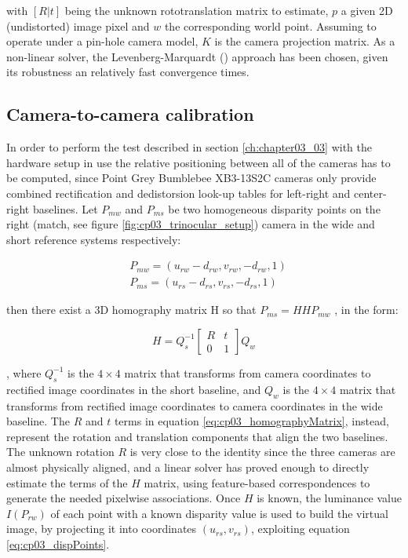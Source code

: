 with $[R|t]$ being the unknown rototranslation matrix to estimate, $p$ a given 2D (undistorted) image pixel and $w$ the corresponding world point. Assuming to operate under a pin-hole camera model, $K$ is the camera projection matrix. As a non-linear solver, the Levenberg-Marquardt (\cite{Levenberg1944}) approach has been chosen, given its robustness an relatively fast convergence times.

\subsection{Camera-to-camera calibration}\label{ch:chapter03_02_02}

In order to perform the test described in section \ref{ch:chapter03_03} with the hardware setup in use the relative positioning between all of the cameras has to be computed, since Point Grey Bumblebee\textregistered{} XB3-13S2C cameras only provide combined rectification and dedistorsion look-up tables for left-right and center-right baselines.
Let $P_{mw}$ and $P_{ms}$ be two homogeneous disparity points on the right (match, see figure \ref{fig:cp03_trinocular_setup}) camera in the wide and short reference systems respectively:

\begin{align}\label{eq:cp03_dispPoints}
& P_{mw} = (u_{rw} - d_{rw}, v_{rw}, -d_{rw}, 1) \nonumber \\
& P_{ms} = (u_{rs} - d_{rs}, v_{rs}, -d_{rs}, 1)
\end{align}

then there exist a 3D homography matrix H so that $P_{ms} = HHP_{mw}$ , in the form:

\begin{equation}\label{eq:cp03_homographyMatrix}
H = Q_s^{-1} \left[ \begin{array}{cc}
R & t \\
0 & 1 \end{array} \right] Q_w
\end{equation}

, where $Q_s^{-1}$ is the $4 \times 4$ matrix that transforms from camera coordinates to rectified image coordinates in the short baseline, and $Q_w$ is the $4 \times 4$ matrix that transforms from rectified image coordinates to camera coordinates in the wide baseline. The $R$ and $t$ terms in equation \ref{eq:cp03_homographyMatrix}, instead, represent the rotation and translation components that align the two baselines. The unknown rotation $R$ is very close to the identity since the three cameras are almost physically aligned, and a linear solver has proved enough to directly estimate the terms of the $H$ matrix, using feature-based correspondences to generate the needed pixelwise associations. Once $H$ is known, the luminance value $I(P_{rw})$ of each point with a known disparity value is used to build the virtual image, by projecting it into coordinates $(u_{rs} , v_{rs})$, exploiting equation \ref{eq:cp03_dispPoints}.

